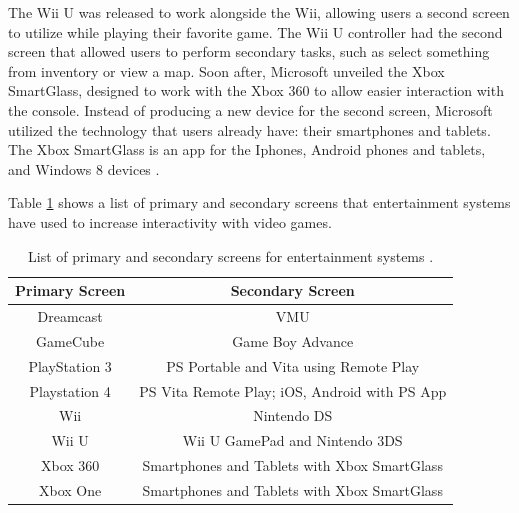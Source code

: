 \documentclass[11pt, oneside]{article}
\begin{document}
The Wii U was released to work alongside the Wii, allowing users a second screen to utilize while playing their favorite game. The Wii U controller had the second screen that allowed users to perform secondary tasks, such as select something from inventory or view a map. Soon after, Microsoft unveiled the Xbox SmartGlass, designed to work with the Xbox 360 to allow easier interaction with the console. Instead of producing a new device for the second screen, Microsoft utilized the technology that users already have: their smartphones and tablets. The Xbox SmartGlass is an app for the Iphones, Android phones and tablets, and Windows 8 devices \cite{MashableSmartGlass}.

Table \ref{entertainment_table} shows a list of primary and secondary screens that entertainment systems have used to increase interactivity with video games. 

\begin{table}
    \centering
    \caption{List of primary and secondary screens for entertainment systems \cite{wiki_second_screen}.}
    \begin{tabular}{| c | c |}
        \hline
        Primary Screen & Secondary Screen \\ \hline
        Dreamcast & VMU \\ \hline
        GameCube & Game Boy Advance \\ \hline
        PlayStation 3 & PS Portable and Vita using Remote Play \\ \hline
        Playstation 4 & PS Vita Remote Play; iOS, Android with PS App \\ \hline
        Wii & Nintendo DS \\ \hline
        Wii U & Wii U GamePad and Nintendo 3DS \\ \hline
        Xbox 360 & Smartphones and Tablets with Xbox SmartGlass\\ \hline
        Xbox One & Smartphones and Tablets with Xbox SmartGlass \\ \hline
    \end{tabular}
    \label{entertainment_table}
\end{table}
\end{document}
